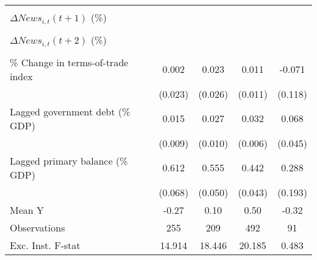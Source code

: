 {\begin{tabular}{l*{4}{c}}
                    &                     &                     &                     &                     \\
\addlinespace
$ \Delta News_{i,t}(t+1)$ (\%)&                     &                     &                     &                     \\
                    &                     &                     &                     &                     \\
\addlinespace
$ \Delta News_{i,t}(t+2)$ (\%)&                     &                     &                     &                     \\
                    &                     &                     &                     &                     \\
\addlinespace
\% Change in terms-of-trade index&       0.002         &       0.023         &       0.011         &      -0.071         \\
                    &     (0.023)         &     (0.026)         &     (0.011)         &     (0.118)         \\
\addlinespace
Lagged government debt (\% GDP)&       0.015\sym{*}  &       0.027\sym{**} &       0.032\sym{***}&       0.068         \\
                    &     (0.009)         &     (0.010)         &     (0.006)         &     (0.045)         \\
\addlinespace
Lagged primary balance (\% GDP)&       0.612\sym{***}&       0.555\sym{***}&       0.442\sym{***}&       0.288         \\
                    &     (0.068)         &     (0.050)         &     (0.043)         &     (0.193)         \\
\midrule
Mean Y              &       -0.27         &        0.10         &        0.50         &       -0.32         \\
Observations        &         255         &         209         &         492         &          91         \\
Exc. Inst. F-stat   &      14.914         &      18.446         &      20.185         &       0.483         \\
\bottomrule
\end{tabular}
}
